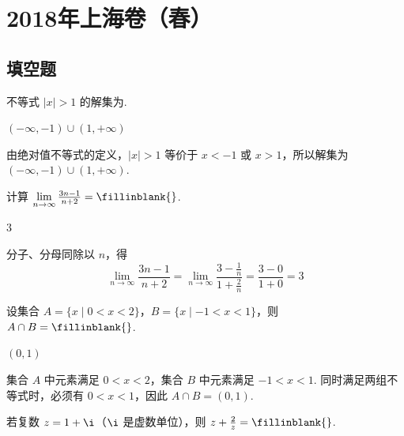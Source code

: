 \chapter{2018年上海卷（春）}

\section{填空题}

\begin{problem}
不等式 \(\lvert x\rvert>1\) 的解集为\fillinblank{}.
\end{problem}

\begin{answer}
\((-\infty,-1)\cup(1,+\infty)\)
\end{answer}

\begin{solution}
由绝对值不等式的定义，\(\lvert x\rvert>1\) 等价于 \(x<-1\) 或 \(x>1\)，所以解集为 \((-\infty,-1)\cup(1,+\infty)\).
\end{solution}

\begin{problem}
计算 \(\lim\limits_{n\to\infty}\frac{3n-1}{n+2}=\fillinblank{}\).
\end{problem}

\begin{answer}
\(3\)
\end{answer}

\begin{solution}
分子、分母同除以 \(n\)，得
\[
\lim\limits_{n\to\infty}\frac{3n-1}{n+2}=\lim\limits_{n\to\infty}\frac{3-\frac1n}{1+\frac2n}=\frac{3-0}{1+0}=3
\]
\end{solution}

\begin{problem}
设集合 \(A=\{x\mid 0<x<2\}\)，\(B=\{x\mid -1<x<1\}\)，则 \(A\cap B=\fillinblank{}\).
\end{problem}

\begin{answer}
\((0,1)\)
\end{answer}

\begin{solution}
集合 \(A\) 中元素满足 \(0<x<2\)，集合 \(B\) 中元素满足 \(-1<x<1\). 同时满足两组不等式时，必须有 \(0<x<1\)，因此 \(A\cap B=(0,1)\).
\end{solution}

\begin{problem}
若复数 \(z=1+\i\)（\(\i\) 是虚数单位），则 \(z+\frac{2}{z}=\fillinblank{}\).
\end{problem}

